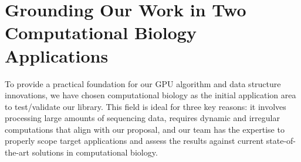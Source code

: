 


\section{Grounding Our Work in Two Computational Biology Applications}
\label{sec:compbio}


To provide a practical foundation for our GPU algorithm and data structure innovations, we have chosen computational biology as the initial application area to test/validate our library. This field is ideal for three key reasons: it involves processing large amounts of sequencing data, requires dynamic and irregular computations that align with our proposal, and our team has the expertise to properly scope target applications and assess the results against current state-of-the-art solutions in computational biology.


